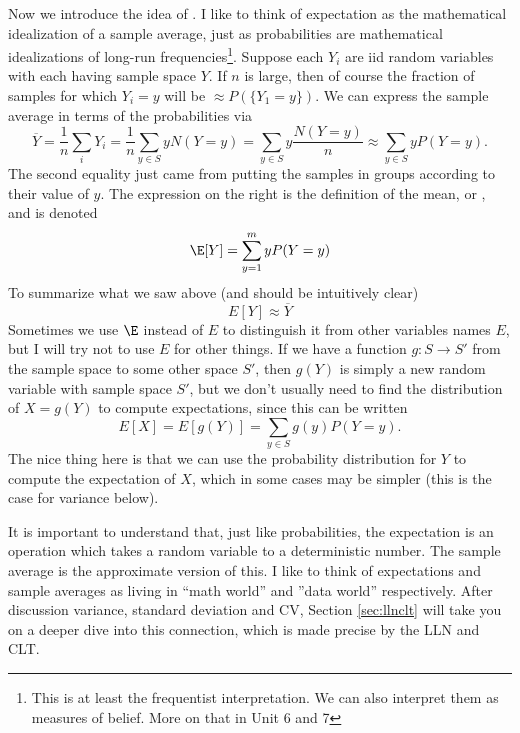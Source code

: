 Now we introduce the idea of . I like to think of expectation as the mathematical idealization of a sample average, just as probabilities are mathematical idealizations of long-run frequencies\footnote{This is at least the frequentist interpretation. We can also interpret them as measures of belief. More on that in Unit 6 and 7}.   Suppose each $Y_i$ are iid random variables with each having sample space $Y$. If $n$ is large, then of course the fraction of samples for which $Y_i= y$ will be $\approx P(\{Y_1=y\})$. We can express the sample average in terms of the probabilities via
 \begin{equation*}
\overline{Y} =  \frac{1}{n}\sum_{i}Y_i = \frac{1}{n} \sum_{y \in S} y N(Y=y) =\sum_{y \in S} y \frac{N(Y=y) }{n}\approx  \sum_{y\in S} y P(Y=y).
\end{equation*}
The second equality just came from putting the samples in groups according to their value of $y$. 
The expression on the right is the definition of the mean, or , and is denoted
\begin{equation}
\E[Y] = \sum_{y=1}^m y P(Y=y)
\end{equation}
  To summarize what we saw above (and should be intuitively clear) 
 \begin{equation}\label{eq:EappoverY}
 E[Y] \approx \overline{Y}
 \end{equation}
 Sometimes we use $\E$ instead of $E$ to distinguish it from other variables names $E$, but I will try not to use $E$ for other things. 
If we have a function $g:S \to S'$ from the sample space to some other space $S'$, then $g(Y)$ is simply a new random variable with sample space $S'$, but we don't usually need to find the distribution of $X = g(Y)$ to compute expectations, since this can be written  
\begin{equation}\label{eq:Efy}
E[X] = E[g(Y)] = \sum_{y\in S} g(y) P(Y=y). 
\end{equation}
The nice thing here is that we can use the probability distribution for $Y$ to compute the expectation of $X$, which in some cases may be simpler (this is the case for variance below). 

 It is important to understand that, just like probabilities, the expectation is an operation which takes a random variable to a deterministic number. The sample average is the approximate version of this. I like to think of expectations and sample averages as living in ``math world'' and ''data world'' respectively. After discussion variance, standard deviation and CV, Section \ref{sec:llnclt} will take you on a deeper dive into this connection, which is made precise by the LLN and CLT. 


